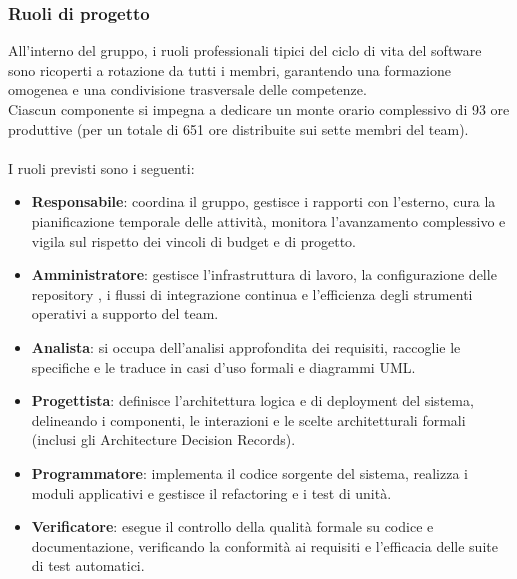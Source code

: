 \subsubsection{Ruoli di progetto}
All'interno del gruppo, i ruoli professionali tipici del ciclo di vita del software sono ricoperti a rotazione da tutti i membri, garantendo una formazione omogenea e una condivisione trasversale delle competenze. \\
Ciascun componente si impegna a dedicare un monte orario complessivo di 93 ore produttive (per un totale di 651 ore distribuite sui sette membri del team). \\
\\
I ruoli previsti sono i seguenti:
\begin{itemize}
    \item \textbf{Responsabile}: coordina il gruppo, gestisce i rapporti con l'esterno, cura la pianificazione temporale delle attività, monitora l'avanzamento complessivo e vigila sul rispetto dei vincoli di budget e di progetto.
    \item \textbf{Amministratore}: gestisce l'infrastruttura di lavoro, la configurazione delle repository , i flussi di integrazione continua e l'efficienza degli strumenti operativi a supporto del team.
    \item \textbf{Analista}: si occupa dell'analisi approfondita dei requisiti, raccoglie le specifiche e le traduce in casi d'uso formali e diagrammi UML.
    \item \textbf{Progettista}: definisce l'architettura logica e di deployment del sistema, delineando i componenti, le interazioni e le scelte architetturali formali (inclusi gli Architecture Decision Records).
    \item \textbf{Programmatore}: implementa il codice sorgente del sistema, realizza i moduli applicativi e gestisce il refactoring e i test di unità.
    \item \textbf{Verificatore}: esegue il controllo della qualità formale su codice e documentazione, verificando la conformità ai requisiti e l'efficacia delle suite di test automatici.
\end{itemize}

